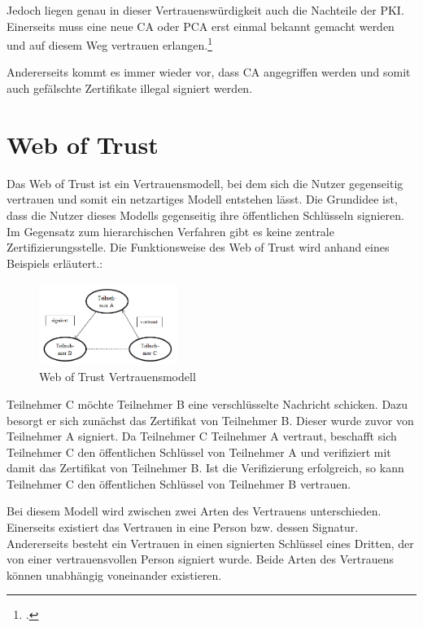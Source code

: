 \documentclass  [paper=a4,
				fontsize=12pt,
				listof=totoc,
				bibliography=totoc
				]{scrreprt}
\begin{document}
			Jedoch liegen genau in dieser Vertrauenswürdigkeit auch die Nachteile der \ac{PKI}. Einerseits muss eine neue \ac{CA} oder \ac{PCA} erst einmal bekannt gemacht werden und auf diesem Weg vertrauen erlangen.\footcite[Vgl.][S. 24]{Schwenk}
			
			Andererseits kommt es immer wieder vor, dass \ac{CA} angegriffen werden und somit auch gefälschte Zertifikate illegal signiert werden.
				
		\section{Web of Trust}
			Das Web of Trust ist ein Vertrauensmodell, bei dem sich die Nutzer gegenseitig vertrauen und somit ein netzartiges Modell entstehen lässt. Die Grundidee ist, dass die Nutzer dieses Modells gegenseitig ihre öffentlichen Schlüsseln signieren. Im Gegensatz zum hierarchischen Verfahren gibt es keine zentrale Zertifizierungsstelle.
			Die Funktionsweise des Web of Trust wird anhand eines Beispiels erläutert.:
			\begin{figure}
			\centering
				\includegraphics[width=0.4\textwidth]{images/WOT.png}
			\caption[Web of Trust Vertrauensmodell]{Web of Trust Vertrauensmodell\footnotemark}
			\end{figure}
			Teilnehmer C möchte Teilnehmer B eine verschlüsselte Nachricht schicken. Dazu besorgt er sich zunächst das Zertifikat von Teilnehmer B. Dieser wurde zuvor von Teilnehmer A signiert. Da Teilnehmer C Teilnehmer A vertraut, beschafft sich Teilnehmer C den öffentlichen Schlüssel von Teilnehmer A und verifiziert mit damit das Zertifikat von Teilnehmer B. Ist die Verifizierung erfolgreich, so kann Teilnehmer C den öffentlichen Schlüssel von Teilnehmer B vertrauen.
			
			Bei diesem Modell wird zwischen zwei Arten des Vertrauens unterschieden. Einerseits existiert das Vertrauen in eine Person bzw. dessen Signatur. Andererseits besteht ein Vertrauen in einen signierten Schlüssel eines Dritten, der von einer vertrauensvollen Person signiert wurde. Beide Arten des Vertrauens können unabhängig voneinander existieren.
\end{document}
